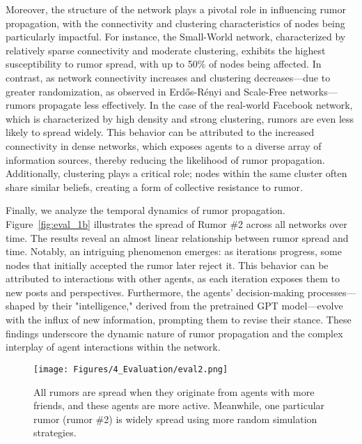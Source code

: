 Moreover, the structure of the network plays a pivotal role in influencing rumor propagation, with the connectivity and clustering characteristics of nodes being particularly impactful. 
For instance, the Small-World network, characterized by relatively sparse connectivity and moderate clustering, exhibits the highest susceptibility to rumor spread, with up to 50\% of nodes being affected. 
In contrast, as network connectivity increases and clustering decreases—due to greater randomization, as observed in Erdős-Rényi and Scale-Free networks—rumors propagate less effectively.
In the case of the real-world Facebook network, which is characterized by high density and strong clustering, rumors are even less likely to spread widely. 
This behavior can be attributed to the increased connectivity in dense networks, which exposes agents to a diverse array of information sources, thereby reducing the likelihood of rumor propagation. 
Additionally, clustering plays a critical role; nodes within the same cluster often share similar beliefs, creating a form of collective resistance to rumor.

Finally, we analyze the temporal dynamics of rumor propagation. Figure~\ref{fig:eval_1b} illustrates the spread of Rumor \#2 across all networks over time. 
The results reveal an almost linear relationship between rumor spread and time. Notably, an intriguing phenomenon emerges: as iterations progress, some nodes that initially accepted the rumor later reject it.
This behavior can be attributed to interactions with other agents, as each iteration exposes them to new posts and perspectives. Furthermore, the agents' decision-making processes—shaped by their "intelligence," derived from the pretrained GPT model—evolve with the influx of new information, prompting them to revise their stance.
These findings underscore the dynamic nature of rumor propagation and the complex interplay of agent interactions within the network.


\begin{figure}[t]
    \centering
    \texttt{[image: Figures/4\_Evaluation/eval2.png]}
    \vspace{-2ex}
    \caption{All rumors are spread when they originate from agents with more friends, and these agents are more active. Meanwhile, one particular rumor (rumor \#2) is widely spread using more random simulation strategies.}
    \label{fig:eval_2}
    \vspace{-2ex}
\end{figure}

